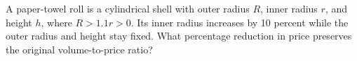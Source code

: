 A paper-towel roll is a cylindrical shell with outer radius $R$, inner radius $r$, and height $h$, where $R>1.1r>0$. Its inner radius increases by 10 percent while the outer radius and height stay fixed. What percentage reduction in price preserves the original volume-to-price ratio?
